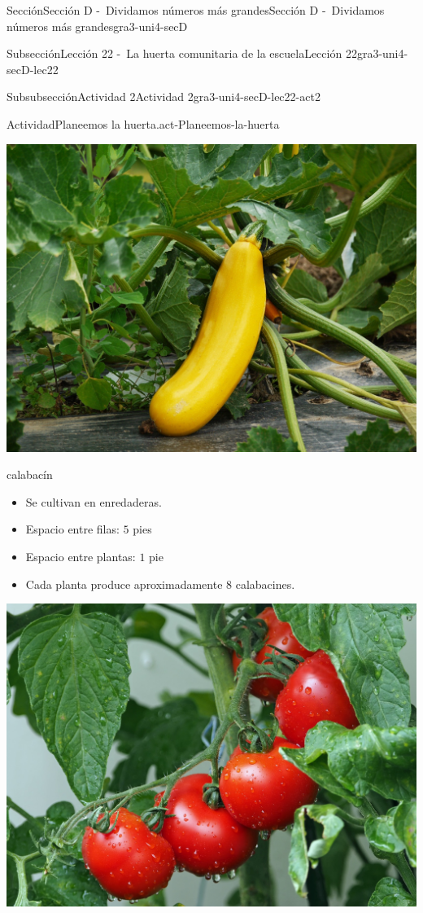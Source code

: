 \documentclass[twoside,10pt,]{article}
\begin{document}
\begin{sectionptx}{Sección}{Sección D -~Dividamos números más grandes}{}{Sección D -~Dividamos números más grandes}{}{}{gra3-uni4-secD}
\begin{subsectionptx}{Subsección}{Lección 22 -~La huerta comunitaria de la escuela}{}{Lección 22}{}{}{gra3-uni4-secD-lec22}
\begin{subsubsectionptx}{Subsubsección}{Actividad 2}{}{Actividad 2}{}{}{gra3-uni4-secD-lec22-act2}
\begin{activity}{Actividad}{Planeemos la huerta.}{act-Planeemos-la-huerta}
\begin{sidebyside}{2}{0.025}{0.025}{0.05}
\begin{sbspanel}{0.45}
\includegraphics[width=\linewidth]{external/jpg-source/3-4-D-22 Act2-calabacin.jpg}
%
\par
calabacín%
%
\begin{itemize}[label=\textbullet]
\item{}Se cultivan en enredaderas.%
\item{}Espacio entre filas: \(5\) pies%
\item{}Espacio entre plantas: \(1\) pie%
\item{}Cada planta produce aproximadamente \(8\) calabacines.%
\end{itemize}
\end{sbspanel}%
\begin{sbspanel}{0.45}%
\includegraphics[width=\linewidth]{external/jpg-source/3-4-D-22 Act2-tomate.jpg}

\end{sbspanel}
\end{sidebyside}
\end{activity}
\end{subsubsectionptx}
\end{subsectionptx}
\end{sectionptx}
\end{document}
